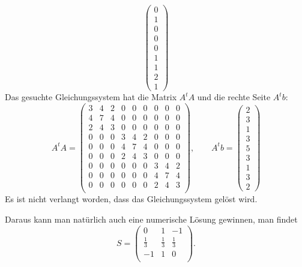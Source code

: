 \begin{loesung}
\[\begin{pmatrix}
0\\1\\0\\
0\\0\\1\\
1\\2\\1
\end{pmatrix}
\]
Das gesuchte Gleichungssystem hat die Matrix $A^tA$ und die rechte
Seite $A^tb$:
\[
A^tA
=
\begin{pmatrix}
3&4&2&0&0&0&0&0&0\\
4&7&4&0&0&0&0&0&0\\
2&4&3&0&0&0&0&0&0\\
%
0&0&0&3&4&2&0&0&0\\
0&0&0&4&7&4&0&0&0\\
0&0&0&2&4&3&0&0&0\\
%
0&0&0&0&0&0&3&4&2\\
0&0&0&0&0&0&4&7&4\\
0&0&0&0&0&0&2&4&3\\
\end{pmatrix}
,\qquad
A^tb=\begin{pmatrix}2\\3\\1\\3\\5\\3\\1\\3\\2\end{pmatrix}
\]
Es ist nicht verlangt worden, dass das Gleichungssystem gelöst wird.

\end{loesung}

\begin{diskussion}
Daraus kann man natürlich auch eine numerische Lösung gewinnen,
man findet
\[
S=\begin{pmatrix}
0& 1& -1\\
\frac{1}{3} & \frac{1}{3} & \frac{1}{3}\\
-1& 1& 0\\
\end{pmatrix}.
\]
\end{diskussion}


